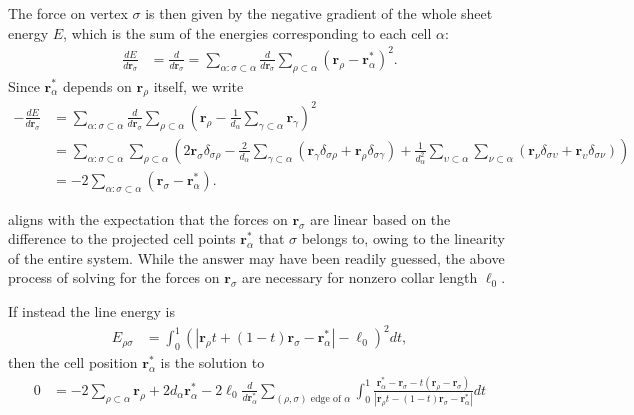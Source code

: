 The force on vertex $\sigma$ is then given by the negative gradient of the whole sheet energy $E$, which is the sum of the energies corresponding to each cell $\alpha$: 
\begin{align*}
    \frac{d E}{d\bm{r}_\sigma} &= \frac{d}{d\bm{r}_\sigma} = \sum_{\alpha:\sigma \subset \alpha} \frac{d}{d\bm{r}_\sigma} \sum_{\rho \subset \alpha} (\bm{r}_\rho - \bm{r}^*_\alpha)^2. 
\end{align*}
\noindent Since $\bm{r}_\alpha^*$ depends on $\bm{r}_\rho$ itself, we write
\begin{align}
	-\frac{dE}{d\bm{r}_\sigma} &= \sum_{\alpha:\sigma \subset \alpha} \frac{d}{d\bm{r}_\sigma} \sum_{\rho \subset \alpha} \left(\bm{r}_\rho - \frac{1}{d_\alpha} \sum_{\gamma\subset\alpha}\bm{r}_\gamma\right)^2 \nonumber \\
	&= \sum_{\alpha:\sigma\subset\alpha} \sum_{\rho\subset\alpha}\left( 2\bm{r}_\sigma \delta_{\sigma\rho} -\frac{2}{d_\alpha} \sum_{\gamma\subset\alpha}(\bm{r}_\gamma \delta_{\sigma\rho} + \bm{r}_\rho \delta_{\sigma\gamma}) + \frac{1}{d_\alpha^2} \sum_{\upsilon\subset\alpha}\sum_{\nu\subset\alpha} (\bm{r}_\nu \delta_{\sigma\upsilon} + \bm{r}_\upsilon \delta_{\sigma\nu}) \right) \nonumber \\
	&= -2 \sum_{\alpha: \sigma\subset\alpha} (\bm{r}_\sigma - \bm{r}_\alpha^*). \label{eq:com}
\end{align}

 aligns with the expectation that the forces on $\bm{r}_\sigma$ are linear based on the difference to the projected cell points $\bm{r}_\alpha^*$ that $\sigma$ belongs to, owing to the linearity of the entire system.
While the answer may have been readily guessed, the above process of solving for the forces on $\bm{r}_\sigma$ are necessary for nonzero collar length $\ell_0$. 

If instead the line energy is 
\begin{align*}
    E_{\rho\sigma} &= \int_0^1 \left(\left|\bm{r}_\rho t + (1-t)\bm{r}_\sigma - \bm{r}_\alpha^*\right| - \ell_0 \right)^2 dt,
\end{align*}
then the cell position $\bm{r}^*_\alpha$ is the solution to
\begin{align}
	0 &= -2\sum_{\rho\subset\alpha} \bm{r}_\rho + 2d_\alpha \bm{r}_\alpha^* -2\ell_0 \frac{d}{d\bm{r}_\alpha^*} \sum_{(\rho,\sigma) \text{ edge of }\alpha} \int_0^1 \frac{\bm{r}_\alpha^* - \bm{r}_\sigma - t (\bm{r}_\rho - \bm{r}_\sigma)}{| \bm{r}_\rho t - (1-t) \bm{r}_\sigma - \bm{r}_\alpha^*|} dt \label{eq:com_full}
\end{align}

